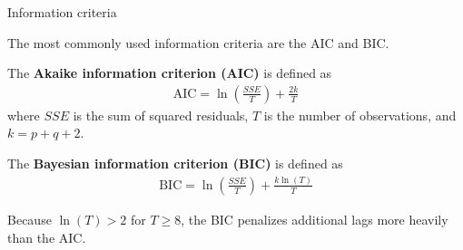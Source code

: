 \documentclass[10pt,aspectratio=169]{beamer}  %
\begin{document}

\begin{frame}{Information criteria}

    \bigskip
    The most commonly used information criteria are the AIC and BIC.

    \medskip
    The \textbf{Akaike information criterion (AIC)} is defined as
    \begin{align*}
        \mathrm{AIC} = \ln \left( \frac{SSE}{T} \right) + \frac{2k}{T}
    \end{align*}
    where $ SSE $ is the sum of squared residuals, $ T $ is the number of observations, and $ k = p + q + 2 $.

    \medskip
    The \textbf{Bayesian information criterion (BIC)} is defined as
    \begin{align*}
        \mathrm{BIC} = \ln \left( \frac{SSE}{T} \right) + \frac{k \ln(T)}{T}
    \end{align*}

    Because $ \ln(T) > 2 $ for $ T \geq 8 $, the BIC penalizes additional lags more heavily than the AIC.

\end{frame}



%     
%     


\end{document}
